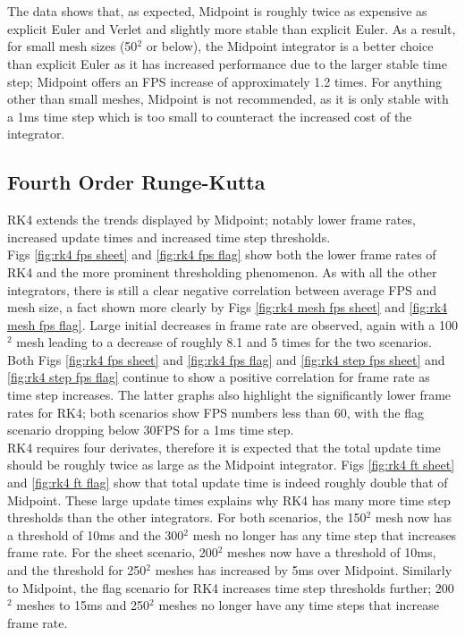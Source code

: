 \\\\The data shows that, as expected, Midpoint is roughly twice as expensive as explicit Euler and Verlet and slightly more stable than explicit Euler. As a result, for small mesh sizes (50$^{2}$ or below), the Midpoint integrator is a better choice than explicit Euler as it has increased performance due to the larger stable time step; Midpoint offers an FPS increase of approximately 1.2 times. For anything other than small meshes, Midpoint is not recommended, as it is only stable with a 1ms time step which is too small to counteract the increased cost of the integrator.

\subsection{Fourth Order Runge-Kutta}
RK4 extends the trends displayed by Midpoint; notably lower frame rates, increased update times and increased time step thresholds.
\\Figs \ref{fig:rk4 fps sheet} and \ref{fig:rk4 fps flag} show both the lower frame rates of RK4 and the more prominent thresholding phenomenon. As with all the other integrators, there is still a clear negative correlation between average FPS and mesh size, a fact shown more clearly by Figs \ref{fig:rk4 mesh fps sheet} and \ref{fig:rk4 mesh fps flag}. Large initial decreases in frame rate are observed, again with a 100$^{2}$ mesh leading to a decrease of roughly 8.1 and 5 times for the two scenarios. 
\\Both Figs \ref{fig:rk4 fps sheet} and \ref{fig:rk4 fps flag} and \ref{fig:rk4 step fps sheet} and \ref{fig:rk4 step fps flag} continue to show a positive correlation for frame rate as time step increases. The latter graphs also highlight the significantly lower frame rates for RK4; both scenarios show FPS numbers less than 60, with the flag scenario dropping below 30FPS for a 1ms time step.
\\RK4 requires four derivates, therefore it is expected that the total update time should be roughly twice as large as the Midpoint integrator. Figs \ref{fig:rk4 ft sheet} and \ref{fig:rk4 ft flag} show that total update time is indeed roughly double that of Midpoint. These large update times explains why RK4 has many more time step thresholds than the other integrators. For both scenarios, the 150$^{2}$ mesh now has a threshold of 10ms and the 300$^{2}$ mesh no longer has any time step that increases frame rate. For the sheet scenario, 200$^{2}$ meshes now have a threshold of 10ms, and the threshold for 250$^{2}$ meshes has increased by 5ms over Midpoint. Similarly to Midpoint, the flag scenario for RK4 increases time step thresholds further; 200$^{2}$ meshes to 15ms and 250$^{2}$ meshes no longer have any time steps that increase frame rate.

